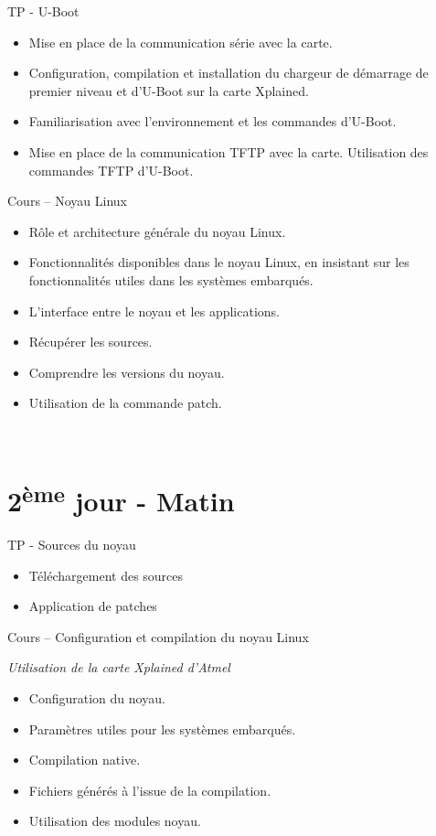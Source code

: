 \documentclass[a4paper,12pt,obeyspaces,spaces,hyphens]{article}
\begin{document}
\feagendatwocolumn
{TP - U-Boot}
{
  \begin{itemize}
  \item Mise en place de la communication série avec la carte.
  \item Configuration, compilation et installation du chargeur de
	démarrage de premier niveau et d'U-Boot sur la carte Xplained.
  \item Familiarisation avec l'environnement et les commandes d'U-Boot.
  \item Mise en place de la communication TFTP avec la carte.
	Utilisation des commandes TFTP d'U-Boot.
  \end{itemize}
}
{Cours – Noyau Linux}
{
  \begin{itemize}
  \item Rôle et architecture générale du noyau Linux.
  \item Fonctionnalités disponibles dans le noyau Linux, en insistant
	sur les fonctionnalités utiles dans les systèmes embarqués.
  \item L'interface entre le noyau et les applications.
  \item Récupérer les sources.
  \item Comprendre les versions du noyau.
  \item Utilisation de la commande patch.
  \end{itemize}
}
\\

\section{2\textsuperscript{ème} jour - Matin}

\feagendatwocolumn
{TP - Sources du noyau}
{
  \begin{itemize}
  \item Téléchargement des sources
  \item Application de patches
  \end{itemize}
}
{Cours – Configuration et compilation du noyau Linux}
{
  {\em Utilisation de la carte Xplained d'Atmel}
  \begin{itemize}
  \item Configuration du noyau.
  \item Paramètres utiles pour les systèmes embarqués.
  \item Compilation native.
  \item Fichiers générés à l'issue de la compilation.
  \item Utilisation des modules noyau.
  \end{itemize}
}
\end{document}
